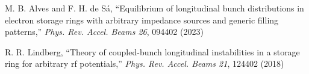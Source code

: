 \documentclass[a4paper,
               biblatex,     %
               ]{jacow}
\begin{document}
{\begin{thebibliography}{9}
    M. B. Alves and F. H. de S\'a,
    ``Equilibrium of longitudinal bunch distributions in electron storage rings with arbitrary impedance sources and generic filling patterns,''
    \emph{Phys. Rev. Accel. Beams 26}, 094402 (2023)

    R. R. Lindberg,
    ``Theory of coupled-bunch longitudinal instabilities in a storage ring for arbitrary rf potentials,''
    \emph{Phys. Rev. Accel. Beams 21}, 124402 (2018)
	\end{thebibliography}
} %
\end{document}

